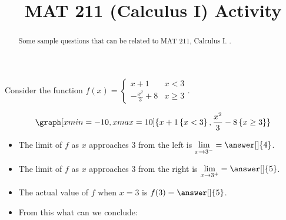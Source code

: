 \documentclass{ximera}
\title{MAT 211 (Calculus I) Activity}
\begin{document}
      
\begin{abstract}
      
Some sample questions that can be related to MAT 211, Calculus I.
.
      
\end{abstract}
      
\maketitle
      
      
\begin{question}      
Consider the function $f(x)=\begin{cases}x+1 & x<3 \\ -\frac{x^2}{3}+8 & x\geq 3\end{cases}$.

\begin{onlineOnly}
$$\graph[xmin=-10,xmax=10]{x+1\left\{x<3\right\}, \frac{x^2}{3}-8\left\{x\ge 3\right\}}$$
\end{onlineOnly}


\begin{itemize}
\item The limit of $f$ as $x$ approaches 3 from the left is $\displaystyle\lim_{x\to 3^-}=\answer[]{4}$.
\item The limit of $f$ as $x$ approaches 3 from the right is $\displaystyle\lim_{x\to 3^+}=\answer[]{5}$.
\item The actual value of $f$ when $x=3$ is $f(3)=\answer[]{5}$.
\item From this what can we conclude:
\begin{multipleChoice}
\end{multipleChoice}

\end{itemize}


\end{question}
\end{document}
